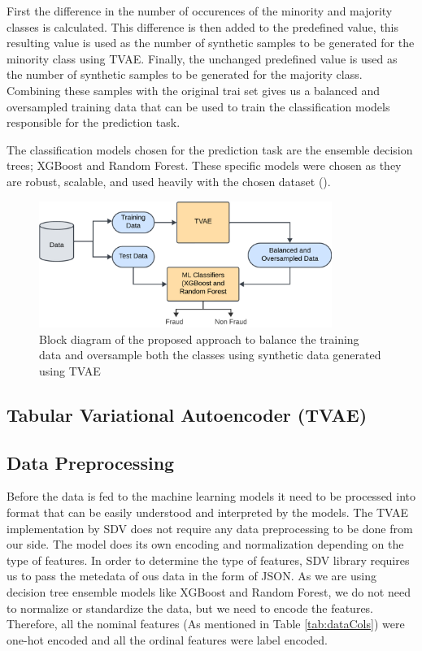 \documentclass[twoside,11pt]{article}
\begin{document}
First the difference in the number of occurences of the minority and majority classes is calculated. This difference is then added to the predefined value, this resulting value is used as the number of synthetic samples to be generated for the minority class using TVAE. Finally, the unchanged predefined value is used as the number of synthetic samples to be generated for the majority class. Combining these samples with the original trai set gives us a balanced and oversampled training data that can be used to train the classification models responsible for the prediction task. 

The classification models chosen for the prediction task are the ensemble decision trees; XGBoost and Random Forest. These specific models were chosen as they are robust, scalable, and used heavily with the chosen dataset (\cite{schrijverAutomobileInsuranceFraud2024, Salmi2022, aiemsuwanNovelHybridMethod2024, owolabiAutoInsuranceFraudDetection2024}). 

\begin{figure}
  \centering
  \includegraphics[width=0.85\textwidth]{images/model_tvae.png}
  \caption{Block diagram of the proposed approach to balance the training data and oversample both the classes using synthetic data generated using TVAE}
  \label{fig:model}
\end{figure}

\subsection{Tabular Variational Autoencoder (TVAE)}



\subsection{Data Preprocessing}
Before the data is fed to the machine learning models it need to be processed into format that can be easily understood and interpreted by the models. The TVAE implementation by SDV does not require any data preprocessing to be done from our side. The model does its own encoding and normalization depending on the type of features. In order to determine the type of features, SDV library requires us to pass the metedata of ous data in the form of JSON. As we are using decision tree ensemble models like XGBoost and Random Forest, we do not need to normalize or standardize the data, but we need to encode the features. Therefore, all the nominal features (As mentioned in Table \ref{tab:dataCols}) were one-hot encoded and all the ordinal features were label encoded.
\end{document}
